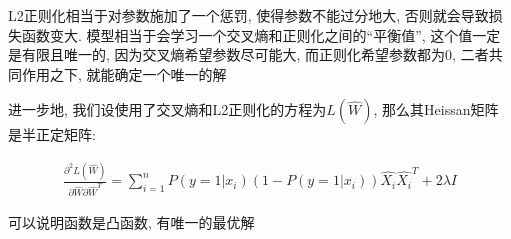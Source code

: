 \documentclass[12pt, a4paper]{article}
\begin{document}
L2正则化相当于对参数施加了一个惩罚, 使得参数不能过分地大, 否则就会导致损失函数变大. 
模型相当于会学习一个交叉熵和正则化之间的“平衡值”, 这个值一定是有限且唯一的,
因为交叉熵希望参数尽可能大, 而正则化希望参数都为0, 二者共同作用之下, 就能确定一个唯一的解

进一步地, 我们设使用了交叉熵和L2正则化的方程为$L(\hat{W})$, 那么其Heissan矩阵是半正定矩阵:

\begin{align*}
    \frac{\partial^2L(\hat{W})}{\partial \hat{W} \partial \hat{W}^T} = 
    \sum_{i=1}^n P(y=1|x_i)(1-P(y=1|x_i))\hat{X_i} \hat{X_i}^T + 2 \lambda I
\end{align*}

可以说明函数是凸函数, 有唯一的最优解
\end{document}
